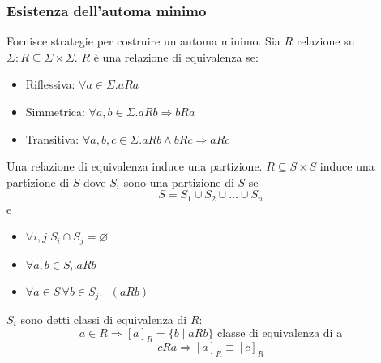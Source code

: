 \documentclass[a4paper]{article}
\begin{document}
\subsubsection{Esistenza dell'automa minimo}

Fornisce strategie per costruire un automa minimo. Sia $R$ relazione su $\Sigma: R \subseteq \Sigma \times \Sigma$.
  $R$ è una relazione di equivalenza se:
  \begin{itemize}
    \item Riflessiva: $\forall a \in \Sigma . aRa$
    \item Simmetrica: $\forall a,b \in \Sigma . aRb \Rightarrow bRa$
    \item Transitiva: $\forall a,b,c \in \Sigma . aRb \wedge bRc \Rightarrow aRc$
  \end{itemize}
  Una relazione di equivalenza induce una partizione.
  $R \subseteq S \times S$ induce una partizione di $S$ dove $S_i$ sono una partizione di $S$ se 
  \[S = S_1 \cup S_2 \cup \dots \cup S_n\]
  e 
  \begin{itemize}
    \item $\forall i,j \; S_i \cap S_j = \varnothing$
    \item $\forall a,b \in S_i . aRb$
    \item $\forall a \in S \, \forall b \in S_j . \neg(aRb)$
  \end{itemize}
  $S_i$ sono detti classi di equivalenza di $R$:
  \[a \in R \Rightarrow [a]_R = \{b \; | \; aRb\} \text{ classe di equivalenza di a}\]
  \[cRa \Rightarrow [a]_R \equiv [c]_R\]
\end{document}
